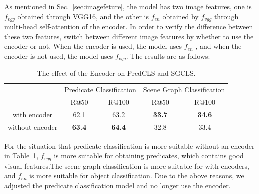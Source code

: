 As mentioned in Sec.~\ref{sec:imagefeture}, the model has two image features, one is $  f_{vgg} $ obtained through VGG16, and the other is $ f_{en} $ obtained by $  f_{vgg} $ through multi-head self-attention of the encoder. In order to verify the difference between these two features, switch between different image features by whether to use the encoder or not. When the encoder is used, the model uses $ f_{en} $ , and when the encoder is not used, the model uses $  f_{vgg} $. The results are as follows:

\begin{table}[]
	\centering
	\begin{tabular}{c|cccc}
		\hline
		\multirow{2}{*}{} & \multicolumn{2}{c|}{Predicate Classification} & \multicolumn{2}{c}{Scene Graph Classification} \\ \cline{2-5} 
		& R@50            & \multicolumn{1}{c|}{R@100}  & R@50                   & R@100                 \\ \hline
		with encoder      & 62.1            & 63.2                        & \textbf{33.7}          & \textbf{34.6}         \\
		without encoder   & \textbf{63.4}   & \textbf{64.4}               & 32.8                   & 33.4            \\ \hline     
	\end{tabular}
	\caption[The effect of encoder on PredCLS and SGCLS]{The effect of the Encoder on PredCLS and SGCLS.} 
	\label{tab:encoder}
\end{table}%

For the situation that predicate classification is more suitable without an encoder in Table~\ref{tab:encoder}, $  f_{vgg} $  is more suitable for obtaining predicates, which contains good visual features.The scene graph classification is more suitable for with encoders, and $ f_{en} $ is more suitable for object classification. Due to the above reasons, we adjusted the predicate classification model and no longer use the encoder.


